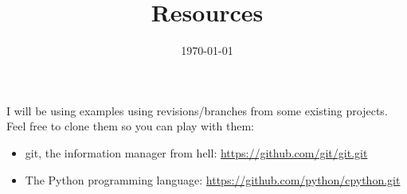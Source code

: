 \documentclass{article}
\title{Resources}
\date{\today}
\begin{document}
\maketitle

I will be using examples using revisions/branches from some existing projects. Feel free to clone them so you can play with them:

\begin{itemize}

	\item git, the information manager from hell: \url{https://github.com/git/git.git}

	\item The Python programming language: \url{https://github.com/python/cpython.git}

\end{itemize}
\end{document}
